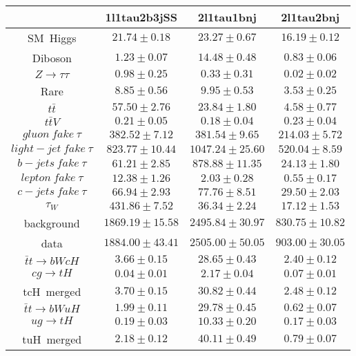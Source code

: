 \centering
\begin{tabular}{|c|c|c|c|} \hline
 & 1l1tau2b3jSS & 2l1tau1bnj & 2l1tau2bnj\\\hline
SM~Higgs & $21.74\pm0.18$ & $23.27\pm0.67$ & $16.19\pm0.12$\\\hline
Diboson & $1.23\pm0.07$ & $14.48\pm0.48$ & $0.83\pm0.06$\\\hline
$Z\to\tau\tau$ & $0.98\pm0.25$ & $0.33\pm0.31$ & $0.02\pm0.02$\\\hline
Rare & $8.85\pm0.56$ & $9.95\pm0.53$ & $3.53\pm0.25$\\\hline
$t\bar{t}$ & $57.50\pm2.76$ & $23.84\pm1.80$ & $4.58\pm0.77$\\\hline
$t\bar{t}V$ & $0.21\pm0.05$ & $0.18\pm0.04$ & $0.23\pm0.04$\\\hline
$gluon~fake~\tau$ & $382.52\pm7.12$ & $381.54\pm9.65$ & $214.03\pm5.72$\\\hline
$light-jet~fake~\tau$ & $823.77\pm10.44$ & $1047.24\pm25.60$ & $520.04\pm8.59$\\\hline
$b-jets~fake~\tau$ & $61.21\pm2.85$ & $878.88\pm11.35$ & $24.13\pm1.80$\\\hline
$lepton~fake~\tau$ & $12.38\pm1.26$ & $2.03\pm0.28$ & $0.55\pm0.17$\\\hline
$c-jets~fake~\tau$ & $66.94\pm2.93$ & $77.76\pm8.51$ & $29.50\pm2.03$\\\hline
$\tau_{W}$ & $431.86\pm7.52$ & $36.34\pm2.24$ & $17.12\pm1.53$\\\hline
background & $1869.19\pm15.58$ & $2495.84\pm30.97$ & $830.75\pm10.82$\\\hline
data & $1884.00\pm43.41$ & $2505.00\pm50.05$ & $903.00\pm30.05$\\\hline
$\bar{t}t\to bWcH$ & $3.66\pm0.15$ & $28.65\pm0.43$ & $2.40\pm0.12$\\\hline
$cg\to tH$ & $0.04\pm0.01$ & $2.17\pm0.04$ & $0.07\pm0.01$\\\hline
tcH~merged & $3.70\pm0.15$ & $30.82\pm0.44$ & $2.48\pm0.12$\\\hline
$\bar{t}t\to bWuH$ & $1.99\pm0.11$ & $29.78\pm0.45$ & $0.62\pm0.07$\\\hline
$ug\to tH$ & $0.19\pm0.03$ & $10.33\pm0.20$ & $0.17\pm0.03$\\\hline
tuH~merged & $2.18\pm0.12$ & $40.11\pm0.49$ & $0.79\pm0.07$\\\hline
\end{tabular}
